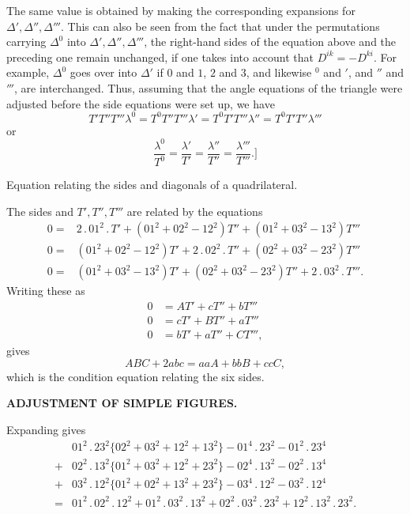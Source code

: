 The same value is obtained by making the corresponding expansions for \(\Delta',\Delta'',\Delta'''\). This can also be seen from the fact that under the permutations carrying \(\Delta^0\) into \(\Delta',\Delta'',\Delta'''\), the right-hand sides of the equation above and the preceding one remain unchanged, if one takes into account that \(D^{ik}=-D^{ki}\). For example, \(\Delta^0\) goes over into \(\Delta'\) if \(0\) and \(1\), \(2\) and \(3\), and likewise \({}^0\) and \({}'\), and \({}''\) and \({}'''\), are interchanged. Thus, assuming that the angle equations of the triangle were adjusted before the side equations were set up, we have
\[
 T'T''T'''\lambda^0=T^0T''T'''\lambda'=T^0T'T'''\lambda''=T^0T'T''\lambda'''
\]
\noindent or
\[
 \frac{\lambda^0}{T^0}=\frac{\lambda'}{T'}=\frac{\lambda''}{T''}=\frac{\lambda'''}{T'''}.\biggr]
\]

\medskip
{\centering
[2.]\par\smallskip
Equation relating the sides and diagonals of a quadrilateral.\par}
The sides and \(T',T'',T'''\) are related by the equations
\[
\begin{aligned}
 0={}&2\,.\,01^2\,.\,T'+(01^2+02^2-12^2)T''+(01^2+03^2-13^2)T'''\\
 0={}&(01^2+02^2-12^2)T'+2\,.\,02^2\,.\,T''+(02^2+03^2-23^2)T'''\\
 0={}&(01^2+03^2-13^2)T'+(02^2+03^2-23^2)T''+2\,.\,03^2\,.\,T'''.
\end{aligned}
\]
Writing these as
\[
\begin{aligned}
 0&=AT'+cT''+bT'''\\
 0&=cT'+BT''+aT'''\\
 0&=bT'+aT''+CT''',
\end{aligned}
\]
\noindent gives
\[
 ABC+2abc=aaA+bbB+ccC,
\]
\noindent which is the condition equation relating the six sides.

\par\clearpage
\noindent\null\hfill{\small\textbf{ADJUSTMENT OF SIMPLE FIGURES.}}\hfill{}\par\medskip

Expanding gives
\[
\begin{aligned}
 &01^2\,.\,23^2\{02^2+03^2+12^2+13^2\}-01^4\,.\,23^2-01^2\,.\,23^4\\
 +{}&02^2\,.\,13^2\{01^2+03^2+12^2+23^2\}-02^4\,.\,13^2-02^2\,.\,13^4\\
 +{}&03^2\,.\,12^2\{01^2+02^2+13^2+23^2\}-03^4\,.\,12^2-03^2\,.\,12^4\\
 ={}&01^2\,.\,02^2\,.\,12^2+01^2\,.\,03^2\,.\,13^2+02^2\,.\,03^2\,.\,23^2+12^2\,.\,13^2\,.\,23^2.
\end{aligned}
\]

